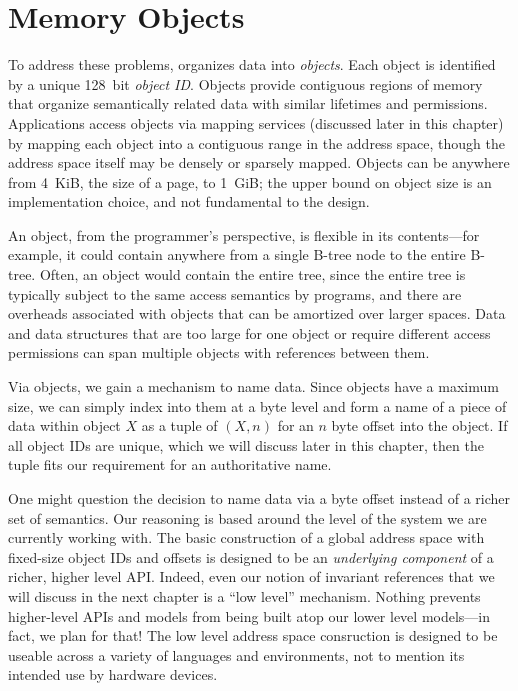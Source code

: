 \section{Memory Objects}
To address these problems, \Twizzler organizes data into \emph{objects}. Each object is
identified by a unique 128~bit \emph{object ID}.
Objects provide contiguous regions of memory that organize
semantically related data with similar lifetimes and permissions.
Applications access objects via
mapping services (discussed later in this chapter) by mapping each object into a contiguous range
in the address space, though the address space itself may be densely or sparsely mapped.
Objects can be anywhere from 4~KiB, the size of a page, to 1~GiB; the upper bound on object size is
an implementation choice, and not fundamental to the design.


An object, from the programmer's perspective, is flexible in its
contents---for example, it could contain anywhere from a single B-tree node to the entire B-tree.
Often, an object would contain the entire tree, since the entire tree is typically subject to
the same access semantics by programs, and there are overheads associated with objects that can be
amortized over larger spaces. Data and data structures that are too large for one object or require
different access permissions can span multiple objects with references between them.

Via objects, we gain a mechanism to name data. Since objects have a maximum size, we can simply index into them at a
byte level and form a name of a piece of data within object $X$ as a tuple of $(X, n)$ for an $n$ byte offset into the
object. If all object IDs are unique, which we will discuss later in this chapter, then the tuple fits our requirement
for an authoritative name.

One might question the decision to name data via a byte offset instead of a richer set of semantics. Our reasoning is
based around the level of the system we are currently working with. The basic construction of a global address space
with fixed-size object IDs and offsets is designed to be an \emph{underlying component} of a richer, higher level API.
Indeed, even our notion of invariant references that we will discuss in the next chapter is a ``low level'' mechanism.
Nothing prevents higher-level APIs and models from being built atop our lower level models---in fact, we plan for that!
The low level address space consruction is designed to be useable across a variety of languages and environments, not to
mention its intended use by hardware devices.

